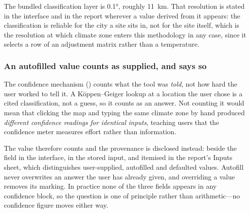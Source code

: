 The bundled classification layer is \ang{0.1}, roughly \SI{11}{\kilo\metre}.
That resolution is stated in the interface and in the report wherever a value
derived from it appears: the classification is reliable for the city a site
sits in, not for the site itself, which is the resolution at which climate zone
enters this methodology in any case, since it selects a row of an adjustment
matrix rather than a temperature.

\subsubsection*{An autofilled value counts as supplied, and says so}

The confidence mechanism () counts what the tool was
\emph{told}, not how hard the user worked to tell it. A K\"oppen--Geiger lookup
at a location the user chose is a cited classification, not a guess, so it
counts as an answer. Not counting it would mean that clicking the map and
typing the same climate zone by hand produced \emph{different confidence
readings for identical inputs}, teaching users that the confidence meter
measures effort rather than information.

The value therefore counts and the provenance is disclosed instead: beside the
field in the interface, in the stored input, and itemised in the report's
Inputs sheet, which distinguishes user-supplied, autofilled and defaulted
values. Autofill never overwrites an answer the user has already given, and
overriding a value removes its marking. In practice none of the three fields
appears in any confidence block, so the question is one of principle rather
than arithmetic---no confidence figure moves either way.
